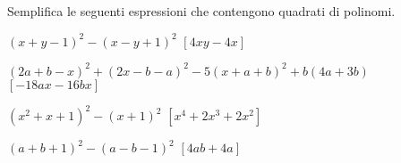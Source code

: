 \begin{esercizio}
\begin{enumeratea}
\end{enumeratea}
\end{esercizio}

\begin{esercizio}[\Ast]
 \label{ese:11.14}
Semplifica le seguenti espressioni che contengono quadrati di polinomi.

\begin{enumeratea}
 \item \((x+y-1)^{2}-(x-y+1)^{2}\)
  \hfill \(\left[4{xy}-4x\right]\)
\item \((2a+b-x)^{2}+(2x-b-a)^{2}-5(x+a+b)^{2}+b(4a+3b)\)
  \hfill \(\left[-18ax-16bx\right]\)
\item \(\left(x^{2}+x+1\right)^{2}-(x+1)^{2}\)
  \hfill \(\left[x^{4}+2x^{3}+2x^{2}\right]\)
\item \((a+b+1)^{2}-(a-b-1)^{2}\)
  \hfill \(\left[4ab+4a\right]\)
\end{enumeratea}
\end{esercizio}

